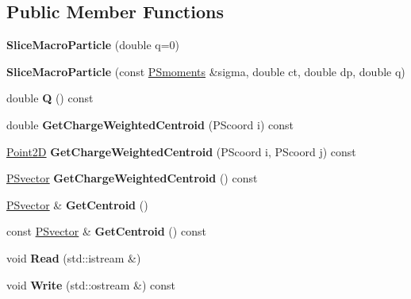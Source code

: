 \subsection*{Public Member Functions}
\begin{DoxyCompactItemize}
\item 
\mbox{\label{classSMPTracking_1_1SliceMacroParticle_a86ac53bf4a820e95213a6eded7f52bb3}} 
{\bfseries Slice\+Macro\+Particle} (double q=0)
\item 
\mbox{\label{classSMPTracking_1_1SliceMacroParticle_a86714e388d309ef1ff7c230c99a8e113}} 
{\bfseries Slice\+Macro\+Particle} (const \hyperlink{classTPSMoments}{P\+Smoments} \&sigma, double ct, double dp, double q)
\item 
\mbox{\label{classSMPTracking_1_1SliceMacroParticle_ad7401639af02cc57b8d2d0a9bb8e3f36}} 
double {\bfseries Q} () const
\item 
\mbox{\label{classSMPTracking_1_1SliceMacroParticle_abb07c361b0e07e0f06b69f03bd2544e9}} 
double {\bfseries Get\+Charge\+Weighted\+Centroid} (P\+Scoord i) const
\item 
\mbox{\label{classSMPTracking_1_1SliceMacroParticle_a6a13c855b4e4678caebe82d15e2f5e74}} 
\hyperlink{classTVec2D}{Point2D} {\bfseries Get\+Charge\+Weighted\+Centroid} (P\+Scoord i, P\+Scoord j) const
\item 
\mbox{\label{classSMPTracking_1_1SliceMacroParticle_a6a24090cec9811a8745d5f6d10bfb379}} 
\hyperlink{classPSvector}{P\+Svector} {\bfseries Get\+Charge\+Weighted\+Centroid} () const
\item 
\mbox{\label{classSMPTracking_1_1SliceMacroParticle_ae32b2208a5db6806e9e797bfe71f2964}} 
\hyperlink{classPSvector}{P\+Svector} \& {\bfseries Get\+Centroid} ()
\item 
\mbox{\label{classSMPTracking_1_1SliceMacroParticle_a82562345cd724f5b9e4675505017ab9d}} 
const \hyperlink{classPSvector}{P\+Svector} \& {\bfseries Get\+Centroid} () const
\item 
\mbox{\label{classSMPTracking_1_1SliceMacroParticle_a2f8c44ddfbb60a94e2c497dc078be100}} 
void {\bfseries Read} (std\+::istream \&)
\item 
\mbox{\label{classSMPTracking_1_1SliceMacroParticle_ac47a4dd80bd572bf70c478da5de48de9}} 
void {\bfseries Write} (std\+::ostream \&) const
\end{DoxyCompactItemize}
